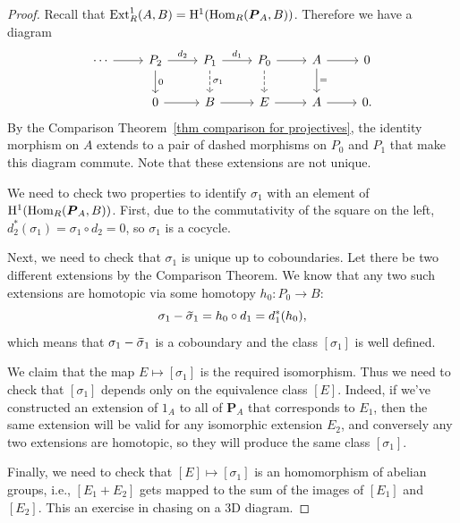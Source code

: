 \begin{proof}
    Recall that $\operatorname{Ext}^1_R(A,B)=\mathrm{H}^1(\operatorname{Hom}_R(\boldsymbol{P}_A,B))$. Therefore we have a diagram
    \[\begin{tikzcd}
        \cdots \arrow[r]&P_2\arrow[r,"d_2"]\arrow[d,"0"] & P_1\arrow[r,"d_1"]\arrow[d,dashed,"\sigma_1"] & P_0 \arrow[r]\arrow[d,dashed] & A\arrow[r]\arrow[d,"="] & 0 \\
        & 0\arrow[r] & B\arrow[r] & E \arrow[r] & A\arrow[r] & 0.
    \end{tikzcd}\]
    By the Comparison Theorem~\ref{thm comparison for projectives}, the identity morphism on $A$ extends to a pair of dashed morphisms on $P_0$ and $P_1$ that make this diagram commute. Note that these extensions are not unique. 

    We need to check two properties to identify $\sigma_1$ with an element of $\mathrm{H}^1(\operatorname{Hom}_R(\boldsymbol{P}_A,B))$. First, due to the commutativity of the square on the left, $d_2^\ast(\sigma_1)=\sigma_1\circ d_2=0$, so $\sigma_1$ is a cocycle. 

    Next, we need to check that $\sigma_1$ is unique up to coboundaries. Let there be two different extensions by the Comparison Theorem. We know that any two such extensions are homotopic via some homotopy $h_0:P_0\to B$:
    \[\sigma_1-\wt{\sigma}_1=h_0\circ d_1=d_1^\ast(h_0),\]
    which means that $\sigma_1-\wt{\sigma}_1$ is a coboundary and the class $[\sigma_1]$ is well defined.

    We claim that the map $E\mapsto [\sigma_1]$ is the required isomorphism. Thus we need to check that $[\sigma_1]$ depends only on the equivalence class $[E]$. Indeed, if we've constructed an extension of $1_A$ to all of $\bm{P}_A$ that corresponds to $E_1$, then the same extension will be valid for any isomorphic extension $E_2$, and conversely any two extensions are homotopic, so they will produce the same class $[\sigma_1]$.

    Finally, we need to check that $[E]\mapsto [\sigma_1]$ is an homomorphism of abelian groups, i.e., $[E_1+E_2]$ gets mapped to the sum of the images of $[E_1]$ and $[E_2]$. This an exercise in chasing on a 3D diagram.


\end{proof}
